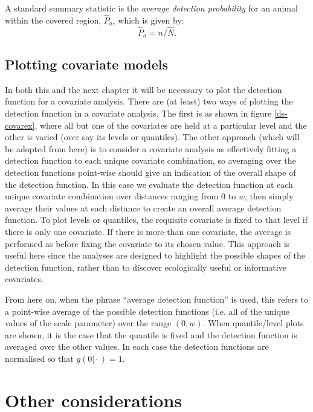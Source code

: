 A standard summary statistic is the \textit{average detection probability} for an animal within the covered region, $\hat{P}_a$, which is given by:
\begin{equation*}
\hat{P}_a = n/\hat{N}.
\end{equation*}

\subsection{Plotting covariate models}
\label{ds-covplot}

\label{cor-8s12-1}In both this and the next chapter it will be necessary to plot the detection function for a covariate analysis. There are (at least) two ways of plotting the detection function in a covariate analysis. The first is as shown in figure \ref{ds-covarex}, where all but one of the covariates are held at a particular level and the other is varied (over say its levels or quantiles). The other approach (which will be adopted from here) is to consider a covariate analysis as effectively fitting a detection function to each unique covariate combination, so averaging over the detection functions point-wise should give an indication of the overall shape of the detection function. In this case we evaluate the detection function at each unique covariate combination over distances ranging from 0 to $w$, then simply average their values at each distance to create an overall average detection function. To plot levels or quantiles, the requisite covariate is fixed to that level if there is only one covariate. If there is more than one covariate, the average is performed as before fixing the covariate to its chosen value. This approach is useful here since the analyses are designed to highlight the possible shapes of the detection function, rather than to discover ecologically useful or informative covariates. 

From here on, when the phrase ``average detection function'' is used, this refers to a point-wise average of the possible detection functions (i.e. all of the unique values of the scale parameter) over the range $(0,w)$. When quantile/level plots are shown, it is the case that the quantile is fixed and the detection function is averaged over the other values. In each case the detection functions are normalised so that $g(0\vert\cdot)=1$.

\section{Other considerations}


